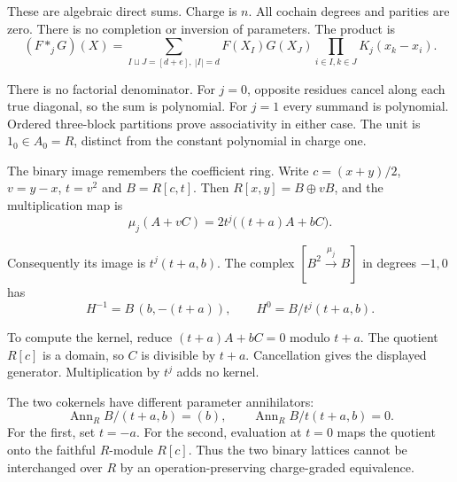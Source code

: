 These are algebraic direct sums. Charge is $n$. All cochain degrees
and parities are zero. There is no completion or inversion of
parameters. The product is
\begin{equation}\label{v4-arith:hall:eq:deformed-shuffle}
 (F*_jG)(X)=\sum_{I\sqcup J=[d+e],\ |I|=d}
 F(X_I)G(X_J)\prod_{i\in I,k\in J}K_j(x_k-x_i).
\end{equation}

There is no factorial denominator. For $j=0$, opposite residues
cancel along each true diagonal, so the sum is polynomial.
For $j=1$ every summand is polynomial. Ordered three-block
partitions prove associativity in either case. The unit is
$1_0\in A_0=R$, distinct from the constant polynomial in charge one.

The binary image remembers the coefficient ring. Write
$c=(x+y)/2$, $v=y-x$, $t=v^2$ and $B=R[c,t]$. Then
$R[x,y]=B\oplus vB$, and the multiplication map is
\begin{equation}\label{v4-arith:hall:eq:binary-image}
 \mu_j(A+vC)=2t^j\bigl((t+a)A+bC\bigr).
\end{equation}

Consequently its image is $t^j(t+a,b)$. The complex
$[B^2\xrightarrow{\mu_j}B]$ in degrees $-1,0$ has
\[
 H^{-1}=B\,(b,-(t+a)),\qquad
 H^0=B/t^j(t+a,b).
\]

To compute the kernel, reduce $(t+a)A+bC=0$ modulo $t+a$.
The quotient $R[c]$ is a domain, so $C$ is divisible by $t+a$.
Cancellation gives the displayed generator. Multiplication by
$t^j$ adds no kernel.


The two cokernels have different parameter
annihilators:
\[
 \operatorname{Ann}_R B/(t+a,b)=(b),\qquad
 \operatorname{Ann}_R B/t(t+a,b)=0.
\]
For the first, set $t=-a$. For the second, evaluation at $t=0$
maps the quotient onto the faithful $R$-module $R[c]$.
Thus the two binary lattices cannot be interchanged over $R$
by an operation-preserving charge-graded equivalence.

